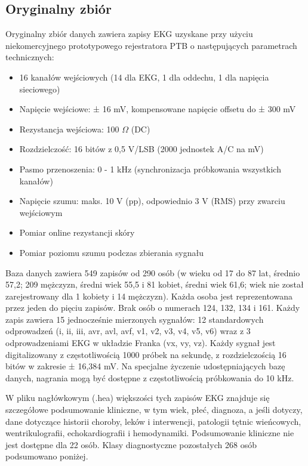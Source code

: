 \documentclass[12pt,a4paper]{article}
\begin{document}
\subsection{Oryginalny zbiór}
Oryginalny zbiór danych \cite{ptb-diagnostic-ecg-database} zawiera zapisy EKG uzyskane przy użyciu niekomercyjnego prototypowego rejestratora PTB o następujących parametrach technicznych:
\begin{itemize}
    \item 16 kanałów wejściowych (14 dla EKG, 1 dla oddechu, 1 dla napięcia sieciowego)
    \item Napięcie wejściowe: ± 16 mV, kompensowane napięcie offsetu do ± 300 mV
    \item Rezystancja wejściowa: 100 $\Omega$ (DC)
    \item Rozdzielczość: 16 bitów z 0,5 \micro V/LSB (2000 jednostek A/C na mV)
    \item Pasmo przenoszenia: 0 - 1 kHz (synchronizacja próbkowania wszystkich kanałów)
    \item Napięcie szumu: maks. 10 \micro V (pp), odpowiednio 3 \micro V (RMS) przy zwarciu wejściowym
    \item Pomiar online rezystancji skóry
    \item Pomiar poziomu szumu podczas zbierania sygnału
\end{itemize}

Baza danych zawiera 549 zapisów od 290 osób (w wieku od 17 do 87 lat, średnio 57,2; 209 mężczyzn, średni wiek 55,5 i 81 kobiet, średni wiek 61,6; wiek nie został zarejestrowany dla 1 kobiety i 14 mężczyzn). Każda osoba jest reprezentowana przez jeden do pięciu zapisów. Brak osób o numerach 124, 132, 134 i 161. Każdy zapis zawiera 15 jednocześnie mierzonych sygnałów: 12 standardowych odprowadzeń (i, ii, iii, avr, avl, avf, v1, v2, v3, v4, v5, v6) wraz z 3 odprowadzeniami EKG w układzie Franka (vx, vy, vz). Każdy sygnał jest digitalizowany z częstotliwością 1000 próbek na sekundę, z rozdzielczością 16 bitów w zakresie ± 16,384 mV. Na specjalne życzenie udostępniających bazę danych, nagrania mogą być dostępne z częstotliwością próbkowania do 10 kHz.

W pliku nagłówkowym (.hea) większości tych zapisów EKG znajduje się szczegółowe podsumowanie kliniczne, w tym wiek, płeć, diagnoza, a jeśli dotyczy, dane dotyczące historii choroby, leków i interwencji, patologii tętnic wieńcowych, wentrikulografii, echokardiografii i hemodynamiki. Podsumowanie kliniczne nie jest dostępne dla 22 osób. Klasy diagnostyczne pozostałych 268 osób podsumowano poniżej.
\end{document}
